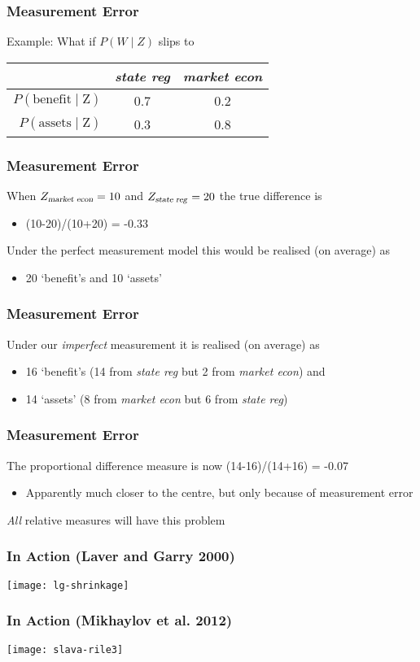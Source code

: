 \documentclass[11pt,compress,professionalfonts]{beamer}
\newcommand{\ita}{\begin{itemize}}
\newcommand{\itm}{\item[]}
\newcommand{\itz}{\end{itemize}}
\begin{document}
\begin{frame}[t,fragile]\frametitle{Measurement Error}

Example: What if $P(W \mid Z)$ slips to
\begin{center}
\begin{tabular}{rcc} \toprule
& \textsl{state reg} & \textsl{market econ} \\ \midrule
$P(\text{benefit} \mid \text{Z})$ & 0.7 & 0.2 \\
$P(\text{assets} \mid  \text{Z})$ & 0.3 & 0.8 \\ \bottomrule
\end{tabular}
\end{center}

\end{frame}
\begin{frame}[t,fragile]\frametitle{Measurement Error}

When $Z_{\text{\textsl{market econ}}}=10$ and $Z_{\text{\textsl{state reg}}}=20$ the true difference is
\ita
\itm (10-20)/(10+20) = -0.33
\itz
Under the perfect measurement model this would be realised (on average) as
\ita
\itm 20 `benefit's and 10 `assets'
\itz

\end{frame}
\begin{frame}[t,fragile]\frametitle{Measurement Error}

Under our \textit{imperfect} measurement it is realised (on average) as
\ita
\itm 16 `benefit's (14 from \textsl{state reg} but 2 from \textsl{market econ}) and
\itm 14 `assets' (8 from \textsl{market econ} but 6 from \textsl{state reg})
\itz

\end{frame}
\begin{frame}[t,fragile]\frametitle{Measurement Error}

The proportional difference measure is now (14-16)/(14+16) = -0.07
\ita
\itm Apparently much closer to the centre, but only because of measurement error
\itz

\textit{All} relative measures will have this problem




\end{frame}
\begin{frame}[t,fragile]\frametitle{In Action (Laver and Garry 2000)}

\centerline{\texttt{[image: lg-shrinkage]}}


\end{frame}
\begin{frame}[t,fragile]\frametitle{In Action (Mikhaylov et al. 2012)}

\centerline{\texttt{[image: slava-rile3]}}

\end{frame}
\end{document}
